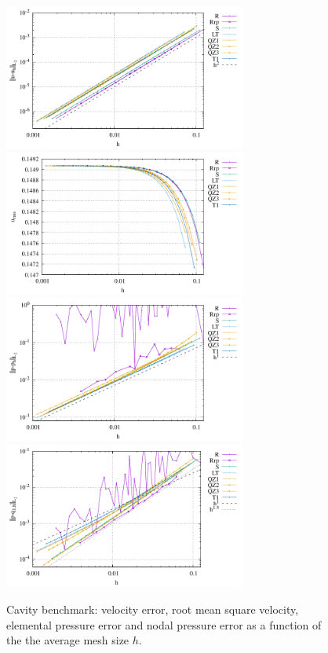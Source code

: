 \documentclass[a4paper]{article}
\begin{document}
\begin{figure}
\centering
\includegraphics[width=8cm]{../results/errors_u_exp7}
\includegraphics[width=8cm]{../results/vrms_exp7} \\
\includegraphics[width=8cm]{../results/errors_p_exp7}
\includegraphics[width=8cm]{../results/errors_q1_exp7}
\caption{Cavity benchmark: velocity error, 
root mean square velocity, elemental pressure error and nodal pressure error
as a function of the the average mesh size $h$.} 
\label{fig:resexp7}
\end{figure}
\end{document}
